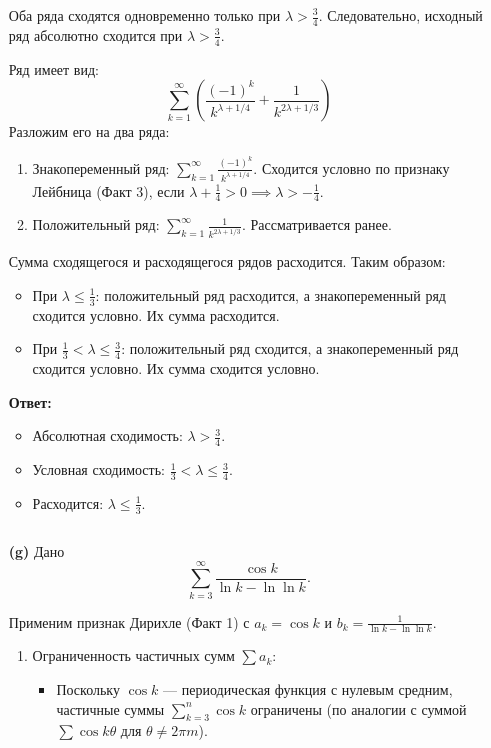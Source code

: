 \documentclass[a4paper]{article}
\renewcommand{\leq}{\leqslant}
\begin{document}
\begin{enumerate}
Оба ряда сходятся одновременно только при \(\lambda > \frac{3}{4}\).
 Следовательно, исходный ряд абсолютно сходится при \(\lambda > \frac{3}{4}\).

Ряд имеет вид:
\[
\sum_{k=1}^{\infty} \left( \frac{(-1)^k}{k^{\lambda + 1/4}} + 
\frac{1}{k^{2\lambda + 1/3}} \right)
\]
Разложим его на два ряда:
\begin{enumerate}
\item Знакопеременный ряд: \(\sum_{k=1}^{\infty} \frac{(-1)^k}{k^{\lambda + 1/4}}\).
 Сходится условно по признаку Лейбница (Факт 3), если \(\lambda + \frac{1}{4} > 0
  \implies \lambda > -\frac{1}{4}\).
\item Положительный ряд: \(\sum_{k=1}^{\infty} \frac{1}{k^{2\lambda + 1/3}}\). 
Рассматривается ранее.
\end{enumerate}

Сумма сходящегося и расходящегося рядов расходится. Таким образом:
\begin{itemize}
\item При \(\lambda \leq \frac{1}{3}\): положительный ряд расходится, а знакопеременный ряд сходится условно. Их сумма расходится.
\item При \(\frac{1}{3} < \lambda \leq \frac{3}{4}\): положительный ряд сходится, а знакопеременный ряд сходится условно. Их сумма сходится условно.
\end{itemize}
\textbf{Ответ: }
\begin{itemize}
  \item Абсолютная сходимость: \(\lambda > \frac{3}{4}\).
  \item Условная сходимость: \(\frac{1}{3} < \lambda \leq \frac{3}{4}\).
  \item Расходится: \(\lambda \leq \frac{1}{3}\).
\end{itemize}$\;$

\item[\textbf{(g)}]Дано
\[
\sum_{k=3}^{\infty} \frac{\cos k}{\ln k - \ln \ln k}.
\]

Применим признак Дирихле (Факт 1) с \( a_k = \cos k \) и \( b_k = \frac{1}{\ln k - \ln \ln k} \).

\begin{enumerate}
\item Ограниченность частичных сумм \( \sum a_k \):
  \begin{itemize}
  \item Поскольку \( \cos k \) — периодическая функция с нулевым средним, частичные суммы \( \sum_{k=3}^n \cos k \) ограничены (по аналогии с суммой \( \sum \cos k \theta \) для \( \theta \neq 2\pi m \)).
  \end{itemize}


\end{enumerate}
\end{enumerate}
\end{document}
